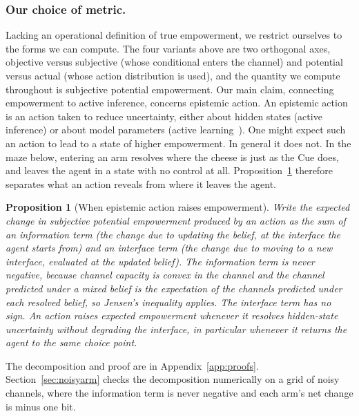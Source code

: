 \documentclass[letterpaper]{article} %
\newtheorem{proposition}{Proposition}
\theoremstyle{definition}
\begin{document}
\subsubsection{Our choice of metric.}
Lacking an operational definition of true empowerment, we restrict ourselves to the forms we can compute. The four variants above are two orthogonal axes, objective versus subjective (whose conditional enters the channel) and potential versus actual (whose action distribution is used), and the quantity we compute throughout is subjective potential empowerment. Our main claim, connecting empowerment to active inference, concerns epistemic action. An epistemic action is an action taken to reduce uncertainty, either about hidden states (active inference) or about model parameters (active learning~\citep{schwartenbeck2019activelearning}). One might expect such an action to lead to a state of higher empowerment. In general it does not. In the maze below, entering an arm resolves where the cheese is just as the Cue does, and leaves the agent in a state with no control at all. Proposition~\ref{prop:epistemic} therefore separates what an action reveals from where it leaves the agent.

\begin{proposition}[When epistemic action raises empowerment]\label{prop:epistemic}
Write the expected change in subjective potential empowerment produced by an action as the sum of an information term (the change due to updating the belief, at the interface the agent starts from) and an interface term (the change due to moving to a new interface, evaluated at the updated belief). The information term is never negative, because channel capacity is convex in the channel and the channel predicted under a mixed belief is the expectation of the channels predicted under each resolved belief, so Jensen's inequality applies. The interface term has no sign. An action raises expected empowerment whenever it resolves hidden-state uncertainty without degrading the interface, in particular whenever it returns the agent to the same choice point.
\end{proposition}

The decomposition and proof are in Appendix~\ref{app:proofs}. Section~\ref{sec:noisyarm} checks the decomposition numerically on a grid of noisy channels, where the information term is never negative and each arm's net change is minus one bit.
\end{document}
